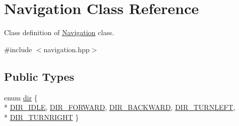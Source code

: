 \hypertarget{classNavigation}{\section{Navigation Class Reference}
\label{classNavigation}
}


Class definition of \hyperlink{classNavigation}{Navigation} class.  




{\ttfamily \#include $<$navigation.\-hpp$>$}

\subsection*{Public Types}
\begin{DoxyCompactItemize}
\item 
enum \hyperlink{classNavigation_a915856c77bca3a74827b950283998811}{dir} \{ \\*
\hyperlink{classNavigation_a915856c77bca3a74827b950283998811adabee5af68507259e5aa7b289ae74db5}{D\-I\-R\-\_\-\-I\-D\-L\-E}, 
\hyperlink{classNavigation_a915856c77bca3a74827b950283998811a00c690a21e4de5edfbb5bb203e01493b}{D\-I\-R\-\_\-\-F\-O\-R\-W\-A\-R\-D}, 
\hyperlink{classNavigation_a915856c77bca3a74827b950283998811aadbb73a5f4b2b1963678f83fe6b748f7}{D\-I\-R\-\_\-\-B\-A\-C\-K\-W\-A\-R\-D}, 
\hyperlink{classNavigation_a915856c77bca3a74827b950283998811ac94586183176f40036b370f2a39b3a63}{D\-I\-R\-\_\-\-T\-U\-R\-N\-L\-E\-F\-T}, 
\\*
\hyperlink{classNavigation_a915856c77bca3a74827b950283998811a6ad8ee097f6b0e87ee22897aa8dc659a}{D\-I\-R\-\_\-\-T\-U\-R\-N\-R\-I\-G\-H\-T}
 \}
\end{DoxyCompactItemize}
